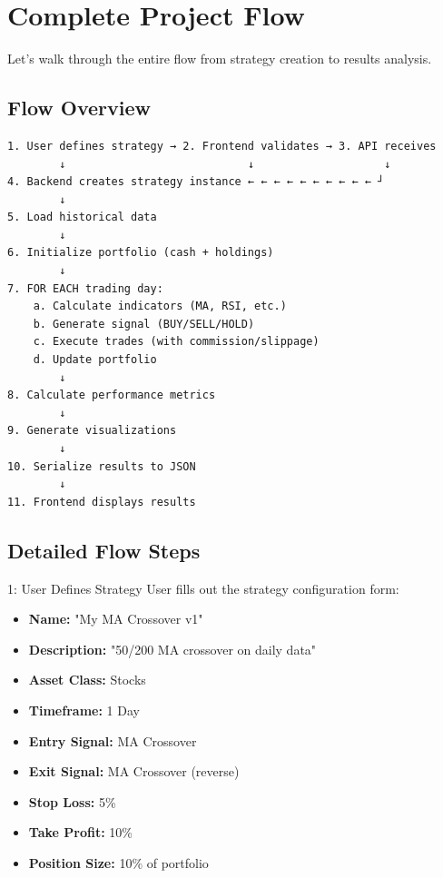 \documentclass[11pt,a4paper]{article}
\begin{document}
\section{Complete Project Flow}

Let's walk through the entire flow from strategy creation to results analysis.

\subsection{Flow Overview}

\begin{verbatim}
1. User defines strategy → 2. Frontend validates → 3. API receives
        ↓                            ↓                    ↓
4. Backend creates strategy instance ← ← ← ← ← ← ← ← ← ← ┘
        ↓
5. Load historical data
        ↓
6. Initialize portfolio (cash + holdings)
        ↓
7. FOR EACH trading day:
    a. Calculate indicators (MA, RSI, etc.)
    b. Generate signal (BUY/SELL/HOLD)
    c. Execute trades (with commission/slippage)
    d. Update portfolio
        ↓
8. Calculate performance metrics
        ↓
9. Generate visualizations
        ↓
10. Serialize results to JSON
        ↓
11. Frontend displays results
\end{verbatim}

\subsection{Detailed Flow Steps}

\begin{flowstep}{1: User Defines Strategy}
User fills out the strategy configuration form:
\begin{itemize}
  \item \textbf{Name:} "My MA Crossover v1"
  \item \textbf{Description:} "50/200 MA crossover on daily data"
  \item \textbf{Asset Class:} Stocks
  \item \textbf{Timeframe:} 1 Day
  \item \textbf{Entry Signal:} MA Crossover
  \item \textbf{Exit Signal:} MA Crossover (reverse)
  \item \textbf{Stop Loss:} 5\%
  \item \textbf{Take Profit:} 10\%
  \item \textbf{Position Size:} 10\% of portfolio
\end{itemize}
\end{flowstep}
\end{document}
